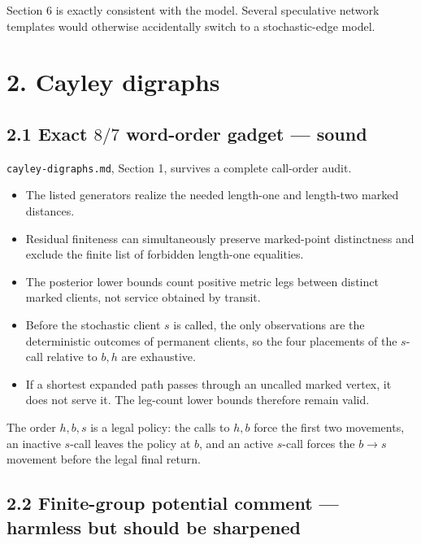 \documentclass[11pt,a4paper]{article}
\begin{document}
Section 6 is exactly consistent with the model.  Several speculative network templates would otherwise accidentally switch to a stochastic-edge model.


\section*{2. Cayley digraphs}

\subsection*{2.1 Exact \(8/7\) word-order gadget — sound}

\nolinkurl{cayley-digraphs.md}, Section 1, survives a complete call-order audit.


\begin{itemize}

\item The listed generators realize the needed length-one and length-two marked distances.

\item Residual finiteness can simultaneously preserve marked-point distinctness and exclude the finite list of forbidden length-one equalities.

\item The posterior lower bounds count positive metric legs between distinct marked clients, not service obtained by transit.

\item Before the stochastic client \(s\) is called, the only observations are the deterministic outcomes of permanent clients, so the four placements of the \(s\)-call relative to \(b,h\) are exhaustive.

\item If a shortest expanded path passes through an uncalled marked vertex, it does not serve it.  The leg-count lower bounds therefore remain valid.

\end{itemize}

The order \(h,b,s\) is a legal policy: the calls to \(h,b\) force the first two movements, an inactive \(s\)-call leaves the policy at \(b\), and an active \(s\)-call forces the \(b\to s\) movement before the legal final return.


\subsection*{2.2 Finite-group potential comment — harmless but should be sharpened}
\end{document}
